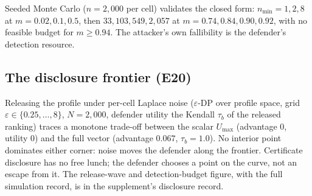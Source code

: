 Seeded Monte Carlo ($n=2{,}000$ per cell) validates the closed form:
$n_{\min}=1,2,8$ at $m=0.02,0.1,0.5$, then $33,103,549,2{,}057$ at
$m=0.74,0.84,0.90,0.92$, with no feasible budget for $m\ge0.94$. The
attacker's own fallibility is the defender's detection resource.

\subsection{The disclosure frontier (E20)}\label{sec:frontier}

Releasing the profile under per-cell Laplace noise ($\varepsilon$-DP over
profile space, grid $\varepsilon\in\{0.25,\dots,8\}$, $N=2{,}000$, defender
utility the Kendall $\tau_b$ of the released ranking) traces a monotone
trade-off between the scalar $U_{\max}$ (advantage $0$, utility $0$) and the
full vector (advantage $0.067$, $\tau_b=1.0$). No interior point dominates
either corner: noise moves the defender along the frontier. Certificate
disclosure has no free lunch; the defender chooses a point on the curve, not
an escape from it. The release-wave and detection-budget figure, with the
full simulation record, is in the supplement's disclosure record.
